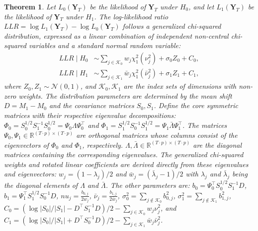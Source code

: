 \documentclass[letterpaper, 10 pt, conference]{ieeeconf}  %
\newtheorem{theorem}{Theorem}
\begin{document}
\begin{theorem}\label{thm:distribution}
Let $L_0(\mathbf{Y}_T)$ be the likelihood of $\mathbf{Y}_T$ under $H_0$, and let $L_1(\mathbf{Y}_T)$ be the likelihood of $\mathbf{Y}_T$ under $H_1$. The log-likelihood ratio $LLR = \log L_1(\mathbf{Y}_T) - \log L_0(\mathbf{Y}_T)$ follows a generalized chi-squared distribution, expressed as a linear combination of independent non-central chi-squared variables and a standard normal random variable:
\begin{align}
    LLR \mid H_0 &\sim \textstyle\sum_{j \in \mathcal{K}_0} w_{j} \chi^2_1(\nu_{j}^2) + \sigma_{0} Z_0 + C_0, \\
    LLR \mid H_1 &\sim \textstyle\sum_{j \in \mathcal{K}_1} \bar{w}_{j} \chi^2_1(\bar{\nu}_{j}^2) + \sigma_{1} Z_1 + C_1,
\end{align}
where $Z_0, Z_1 \sim \mathcal{N}(0,1)$, and $\mathcal{K}_0, \mathcal{K}_1$ are the index sets of dimensions with non-zero weights. The distribution parameters are determined by the mean shift $D = M_1 - M_0$ and the covariance matrices $S_0, S_1$. Define the core symmetric matrices with their respective eigenvalue decompositions: $\Phi_0 = S_0^{1/2} S_1^{-1} S_0^{1/2} = \Psi_0 \Lambda \Psi_0^\top$ and $\Phi_1 = S_1^{1/2} S_0^{-1} S_1^{1/2} = \Psi_1 \bar{\Lambda} \Psi_1^\top$. The matrices $\Psi_0, \Psi_1 \in \mathbb{R}^{(T\cdot p) \times (T\cdot p)}$ are orthogonal matrices whose columns consist of the eigenvectors of $\Phi_0$ and $\Phi_1$, respectively. $\Lambda, \bar{\Lambda} \in \mathbb{R}^{(T\cdot p) \times (T\cdot p)}$ are the diagonal matrices containing the corresponding eigenvalues.
The generalized chi-squared weights and rotated linear coefficients are derived directly from these eigenvalues and eigenvectors: $w_j = (1 - \lambda_j)/2$ and $\bar{w}_j = (\bar{\lambda}_j - 1)/2$ with $\lambda_j$ and $\bar{\lambda}_j$ being the diagonal elements of $\Lambda$ and $\bar{\Lambda}$. The other parameters are: $b_0 = \Psi_0^\top S_0^{1/2} S_1^{-1} D$, $b_1 = \Psi_1^\top S_1^{1/2} S_0^{-1} D$, $nu_{j} = \frac{b_{0,j}}{2w_{j}}$, $\bar{\nu}_{j} = \frac{b_{1,j}}{2\bar{w}_{j}}$, $\sigma_0^2 = \sum_{j \notin \mathcal{K}_0} b_{0,j}^2$, $\sigma_1^2 = \sum_{j \notin \mathcal{K}_1} b_{1,j}^2$, $C_0 = ( \log |S_{0}|/|S_{1}| - D^\top S_{1}^{-1} D )/2 - \sum_{j \in \mathcal{K}_0} w_{j} \nu_{j}^2$, and $C_1 =( \log |S_{0}|/|S_{1}| + D^\top S_{0}^{-1} D )/2 - \sum_{j \in \mathcal{K}_1} \bar{w}_{j} \bar{\nu}_{j}^2$.
\end{theorem}
\end{document}
